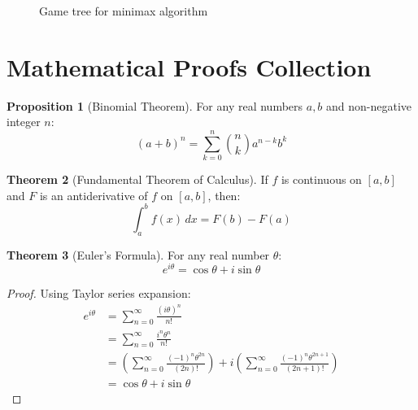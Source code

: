 \documentclass[11pt,a4paper]{article}
\theoremstyle{definition}
\newtheorem{theorem}{Theorem}[section]
\newtheorem{proposition}[theorem]{Proposition}
\begin{document}
\begin{figure}[H]
\centering
{}
\caption{Game tree for minimax algorithm}
\label{fig:gametree}
\end{figure}

\section{Mathematical Proofs Collection}

\begin{proposition}[Binomial Theorem]
For any real numbers $a, b$ and non-negative integer $n$:
\begin{equation}
    (a + b)^n = \sum_{k=0}^{n} \binom{n}{k} a^{n-k}b^k
\end{equation}
\end{proposition}

\begin{theorem}[Fundamental Theorem of Calculus]
If $f$ is continuous on $[a,b]$ and $F$ is an antiderivative of $f$ on $[a,b]$, then:
\begin{equation}
    \int_a^b f(x)\,dx = F(b) - F(a)
\end{equation}
\end{theorem}

\begin{theorem}[Euler's Formula]
For any real number $\theta$:
\begin{equation}
    e^{i\theta} = \cos\theta + i\sin\theta
\end{equation}
\end{theorem}

\begin{proof}
Using Taylor series expansion:
\begin{align}
    e^{i\theta} &= \sum_{n=0}^{\infty} \frac{(i\theta)^n}{n!} \\
    &= \sum_{n=0}^{\infty} \frac{i^n\theta^n}{n!} \\
    &= \left(\sum_{n=0}^{\infty} \frac{(-1)^n\theta^{2n}}{(2n)!}\right) + i\left(\sum_{n=0}^{\infty} \frac{(-1)^n\theta^{2n+1}}{(2n+1)!}\right) \\
    &= \cos\theta + i\sin\theta
\end{align}
\end{proof}
\end{document}
